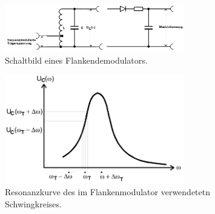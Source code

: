 \begin{figure}
\centering
\includegraphics[width=0.7\textwidth]{figures/flankenmodulator.PNG}
\caption{Schaltbild eines Flankendemodulators.\cite{sample}}
\label{fig:11}
\end{figure}

\begin{figure}
\centering
\includegraphics[width=0.7\textwidth]{figures/resonanzkurve.PNG}
\caption{Resonanzkurve des im Flankenmodulator verwendetetn Schwingkreises.\cite{sample}}
\label{fig:12}
\end{figure}
